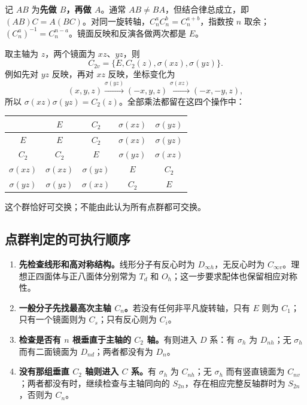 记 $AB$ 为\textbf{先做 $B$，再做 $A$}。通常 $AB\ne BA$，但结合律总成立，即 $(AB)C=A(BC)$。对同一旋转轴，$C_n^aC_n^b=C_n^{a+b}$，指数按 $n$ 取余；$(C_n^a)^{-1}=C_n^{n-a}$。镜面反映和反演各做两次都是 $E$。

\begin{worked}[$C_{2v}$：四个操作组成一个完整的小群]
取主轴为 $z$，两个镜面为 $xz$、$yz$，则
\[
 C_{2v}=\{E,C_2(z),\sigma(xz),\sigma(yz)\}.
\]
例如先对 $yz$ 反映，再对 $xz$ 反映，坐标变化为
\[
 (x,y,z)\xrightarrow{\sigma(yz)}(-x,y,z)
 \xrightarrow{\sigma(xz)}(-x,-y,z),
\]
所以 $\sigma(xz)\sigma(yz)=C_2(z)$。全部乘法都留在这四个操作中：
\begin{center}
\small
\begin{tabular}{c|cccc}
 & $E$ & $C_2$ & $\sigma(xz)$ & $\sigma(yz)$\\\hline
$E$ & $E$ & $C_2$ & $\sigma(xz)$ & $\sigma(yz)$\\
$C_2$ & $C_2$ & $E$ & $\sigma(yz)$ & $\sigma(xz)$\\
$\sigma(xz)$ & $\sigma(xz)$ & $\sigma(yz)$ & $E$ & $C_2$\\
$\sigma(yz)$ & $\sigma(yz)$ & $\sigma(xz)$ & $C_2$ & $E$
\end{tabular}
\end{center}
这个群恰好可交换；不能由此认为所有点群都可交换。
\end{worked}

\subsection{点群判定的可执行顺序}
\begin{enumerate}
\item \textbf{先检查线形和高对称结构。}线形分子有反心时为 $D_{\infty h}$，无反心时为 $C_{\infty v}$。理想正四面体与正八面体分别常为 $T_d$ 和 $O_h$；这一步要求配体也保留相应对称性。
\item \textbf{一般分子先找最高次主轴 $C_n$。}若没有任何非平凡旋转轴，只有 $E$ 则为 $C_1$；只有一个镜面则为 $C_s$；只有反心则为 $C_i$。
\item \textbf{检查是否有 $n$ 根垂直于主轴的 $C_2$ 轴。}有则进入 $D$ 系：有 $\sigma_h$ 为 $D_{nh}$；无 $\sigma_h$ 而有二面镜面为 $D_{nd}$；两者都没有为 $D_n$。
\item \textbf{没有那组垂直 $C_2$ 轴则进入 $C$ 系。}有 $\sigma_h$ 为 $C_{nh}$；无 $\sigma_h$ 而有竖直镜面为 $C_{nv}$；两者都没有时，继续检查与主轴同向的 $S_{2n}$，存在相应完整反轴群时为 $S_{2n}$，否则为 $C_n$。
\end{enumerate}

